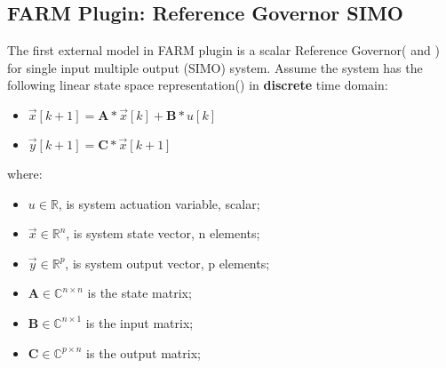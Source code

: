 \subsection{FARM Plugin: Reference Governor SIMO}
\label{RG_SIMO}
  The first external model in FARM plugin is a scalar Reference Governor(\cite{kolmanovsky2014reference} and 
  \cite{garone2017reference}) for single input multiple output (SIMO) system. Assume 
  the system has the following linear state space representation(\cite{rowell2002state}) in \textbf{discrete} time domain:
  \begin{itemize}
  \item \begin{math} \overrightarrow{x}[k+1]=\textbf{A}*\overrightarrow{x}[k]+\textbf{B}*u[k] \end{math}
  \item \begin{math} \overrightarrow{y}[k+1]=\textbf{C}*\overrightarrow{x}[k+1] \end{math}
  \end{itemize}
  where:
  \begin{itemize}
  \item \begin{math} u\in\mathbb{R} \end{math}, is system actuation variable, scalar;
  \item \begin{math} \overrightarrow{x}\in\mathbb{R}^n \end{math}, is system state vector, n elements;
  \item \begin{math} \overrightarrow{y}\in\mathbb{R}^p \end{math}, is system output vector, p elements;
  \item \begin{math} \textbf{A}\in\mathbb{C}^{n \times n} \end{math} is the state matrix;
  \item \begin{math} \textbf{B}\in\mathbb{C}^{n \times 1} \end{math} is the input matrix;
  \item \begin{math} \textbf{C}\in\mathbb{C}^{p \times n} \end{math} is the output matrix;
  
  \end{itemize}

